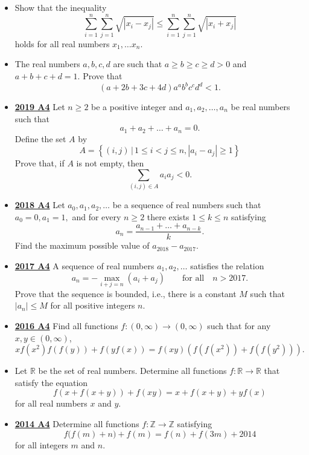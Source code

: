 \documentclass[11pt]{scrartcl}
\begin{document}
\begin{itemize}[leftmargin=*]
\item {} 	Show that the inequality\[\sum_{i=1}^n \sum_{j=1}^n \sqrt{|x_i-x_j|}\leqslant \sum_{i=1}^n \sum_{j=1}^n \sqrt{|x_i+x_j|}\]holds for all real numbers $x_1,\dots x_n.$
\item {} The real numbers $a, b, c, d$ are such that $a\geqslant  b\geqslant  c\geqslant  d>0$ and $a+b+c+d=1$. Prove that
\[(a+2b+3c+4d)a^ab^bc^cd^d<1.\]
\item \href{https://artofproblemsolving.com/community/c6h2279021p17829013}{\textbf{2019 A4}} Let $n\geqslant  2$ be a positive integer and $a_1,a_2, \dots ,a_n$ be real numbers such that\[a_1+a_2+\dots+a_n=0.\]Define the set $A$ by
\[A=\left\{(i, j)\,|\,1 \leqslant i<j \leqslant n,\left|a_{i}-a_{j}\right| \geqslant  1\right\}\]Prove that, if $A$ is not empty, then
\[\sum_{(i, j) \in A} a_{i} a_{j}<0.\]
\item \href{https://artofproblemsolving.com/community/c6h1876762p12752819}{\textbf{2018 A4}} Let $a_0,a_1,a_2,\dots $ be a sequence of real numbers such that $a_0=0, a_1=1,$ and for every $n\geqslant  2$ there exists $1 \leqslant k \leqslant n$ satisfying\[ a_n=\frac{a_{n-1}+\dots + a_{n-k}}{k}. \]Find the maximum possible value of $a_{2018}-a_{2017}$.
\item \href{https://artofproblemsolving.com/community/c6h1671279p10632313}{\textbf{2017 A4}} A sequence of real numbers $a_1,a_2,\dots$ satisfies the relation
$$a_n=-\max_{i+j=n}(a_i+a_j)\qquad\text{for all}\quad n>2017.$$Prove that the sequence is bounded, i.e., there is a constant $M$ such that $|a_n|\leqslant M$ for all positive integers $n$.
\item \href{https://artofproblemsolving.com/community/c6h1480721p8639325}{\textbf{2016 A4}} Find all functions $f:(0,\infty)\rightarrow (0,\infty)$ such that for any $x,y\in (0,\infty)$,$$xf(x^2)f(f(y)) + f(yf(x)) = f(xy) \left(f(f(x^2)) + f(f(y^2))\right).$$
\item {} Let $\mathbb R$ be the set of real numbers. Determine all functions $f:\mathbb R\to\mathbb R$ that satisfy the equation\[f(x+f(x+y))+f(xy)=x+f(x+y)+yf(x)\]for all real numbers $x$ and $y$.
\item \href{https://artofproblemsolving.com/community/c6h1113177p5083531}{\textbf{2014 A4}} Determine all functions $f: \mathbb{Z}\to\mathbb{Z}$ satisfying\[f\big(f(m)+n\big)+f(m)=f(n)+f(3m)+2014\]for all integers $m$ and $n$.

\end{itemize}
\end{document}
